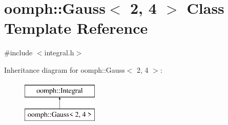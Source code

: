 \hypertarget{classoomph_1_1Gauss_3_012_00_014_01_4}{}\section{oomph\+:\+:Gauss$<$ 2, 4 $>$ Class Template Reference}
\label{classoomph_1_1Gauss_3_012_00_014_01_4}


{\ttfamily \#include $<$integral.\+h$>$}

Inheritance diagram for oomph\+:\+:Gauss$<$ 2, 4 $>$\+:\begin{figure}[H]
\begin{center}
\leavevmode
\includegraphics[height=2.000000cm]{classoomph_1_1Gauss_3_012_00_014_01_4}
\end{center}
\end{figure}
